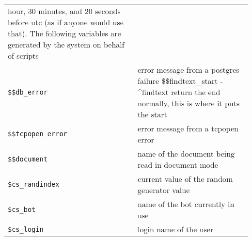 \documentclass[]{article}
\begin{document}
\begin{longtable}[]{@{}ll@{}}
\begin{minipage}[t]{0.10\columnwidth}
hour, 30 minutes, and 20 seconds before utc (as if anyone would use
that). The following variables are generated by the system on behalf of
scripts\strut
\end{minipage}\tabularnewline
\begin{minipage}[t]{0.26\columnwidth}\raggedright\strut
\texttt{\$\$db\_error}\strut
\end{minipage} & \begin{minipage}[t]{0.10\columnwidth}\raggedright\strut
error message from a postgres failure \$\$findtext\_start - \^{}findtext
return the end normally, this is where it puts the start\strut
\end{minipage}\tabularnewline
\begin{minipage}[t]{0.26\columnwidth}\raggedright\strut
\texttt{\$\$tcpopen\_error}\strut
\end{minipage} & \begin{minipage}[t]{0.10\columnwidth}\raggedright\strut
error message from a tcpopen error\strut
\end{minipage}\tabularnewline
\begin{minipage}[t]{0.26\columnwidth}\raggedright\strut
\texttt{\$\$document}\strut
\end{minipage} & \begin{minipage}[t]{0.10\columnwidth}\raggedright\strut
name of the document being read in document mode\strut
\end{minipage}\tabularnewline
\begin{minipage}[t]{0.26\columnwidth}\raggedright\strut
\texttt{\$cs\_randindex}\strut
\end{minipage} & \begin{minipage}[t]{0.10\columnwidth}\raggedright\strut
current value of the random generator value\strut
\end{minipage}\tabularnewline
\begin{minipage}[t]{0.26\columnwidth}\raggedright\strut
\texttt{\$cs\_bot}\strut
\end{minipage} & \begin{minipage}[t]{0.10\columnwidth}\raggedright\strut
name of the bot currently in use\strut
\end{minipage}\tabularnewline
\begin{minipage}[t]{0.26\columnwidth}\raggedright\strut
\texttt{\$cs\_login}\strut
\end{minipage} & \begin{minipage}[t]{0.10\columnwidth}\raggedright\strut
login name of the user\strut
\end{minipage}\tabularnewline
\bottomrule
\end{longtable}
\end{document}
